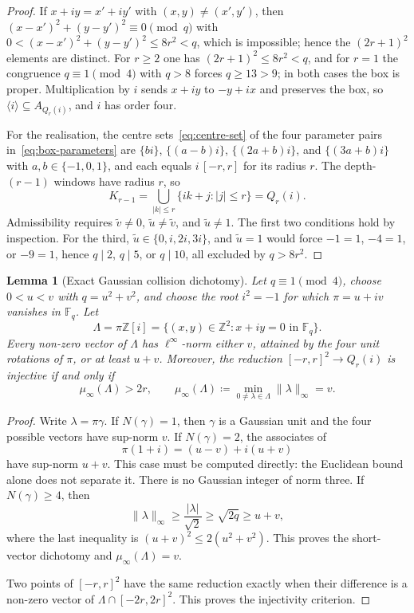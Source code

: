 \documentclass[11pt,a4paper]{article}
\newtheorem{lemma}[theorem]{Lemma}
\theoremstyle{definition}
\theoremstyle{remark}
\newcommand{\Fq}{\mathbb{F}_q}
\begin{document}
\begin{proof}
  If $x+iy=x'+iy'$ with $(x,y)\ne(x',y')$, then $(x-x')^2+(y-y')^2\equiv0\pmod q$ with
  $0<(x-x')^2+(y-y')^2\leq8r^2<q$, which is impossible; hence the $(2r+1)^2$ elements are
  distinct.
  For $r\geq2$ one has $(2r+1)^2\leq8r^2<q$, and for $r=1$ the congruence $q\equiv1\pmod4$
  with $q>8$ forces $q\geq13>9$; in both cases the box is proper.
  Multiplication by $i$ sends $x+iy$ to $-y+ix$ and preserves the box, so
  $\langle i\rangle\subseteq A_{Q_r(i)}$, and $i$ has order four.

  For the realisation, the centre sets~\eqref{eq:centre-set} of the four parameter pairs
  in~\eqref{eq:box-parameters} are
  $\{bi\}$, $\{(a-b)i\}$, $\{(2a+b)i\}$, and $\{(3a+b)i\}$ with $a,b\in\{-1,0,1\}$, and each
  equals $i\,[-r,r]$ for its radius $r$.
  The depth-$(r-1)$ windows have radius $r$, so
  \[
    K_{r-1}=\bigcup_{|k|\leq r}\{ik+j:|j|\leq r\}=Q_r(i).
  \]
  Admissibility requires $\widetilde v\ne0$, $\widetilde u\ne\widetilde v$, and
  $\widetilde u\ne1$.
  The first two conditions hold by inspection.
  For the third, $\widetilde u\in\{0,i,2i,3i\}$, and $\widetilde u=1$ would force
  $-1=1$, $-4=1$, or $-9=1$, hence $q\mid2$, $q\mid5$, or $q\mid10$, all excluded by
  $q>8r^2$.
\end{proof}

\begin{lemma}[Exact Gaussian collision dichotomy]
  \label{lem:gaussian-collision-dichotomy}
  Let $q\equiv1\pmod4$, choose $0<u<v$ with $q=u^2+v^2$, and choose the root
  $i^2=-1$ for which $\pi=u+iv$ vanishes in $\Fq$.
  Let
  \[
    \Lambda=\pi\mathbb{Z}[i]
    =\{(x,y)\in\mathbb{Z}^2:x+iy=0\text{ in }\Fq\}.
  \]
  Every non-zero vector of $\Lambda$ has $\ell^\infty$-norm either $v$, attained by the
  four unit rotations of $\pi$, or at least $u+v$.
  Moreover, the reduction $[-r,r]^2\to Q_r(i)$ is injective if and only if
  \[
    \mu_\infty(\Lambda)>2r,
    \qquad
    \mu_\infty(\Lambda)\coloneqq
    \min_{0\ne\lambda\in\Lambda}\|\lambda\|_\infty=v.
  \]
\end{lemma}

\begin{proof}
  Write $\lambda=\pi\gamma$.
  If $N(\gamma)=1$, then $\gamma$ is a Gaussian unit and the four possible vectors have
  sup-norm $v$.
  If $N(\gamma)=2$, the associates of
  \[
    \pi(1+i)=(u-v)+i(u+v)
  \]
  have sup-norm $u+v$.
  This case must be computed directly: the Euclidean bound alone does not separate it.
  There is no Gaussian integer of norm three.
  If $N(\gamma)\geq4$, then
  \[
    \|\lambda\|_\infty
    \geq\frac{|\lambda|}{\sqrt2}
    \geq\sqrt{2q}
    \geq u+v,
  \]
  where the last inequality is $(u+v)^2\leq2(u^2+v^2)$.
  This proves the short-vector dichotomy and $\mu_\infty(\Lambda)=v$.

  Two points of $[-r,r]^2$ have the same reduction exactly when their difference is a
  non-zero vector of $\Lambda\cap[-2r,2r]^2$.
  This proves the injectivity criterion.
\end{proof}
\end{document}
